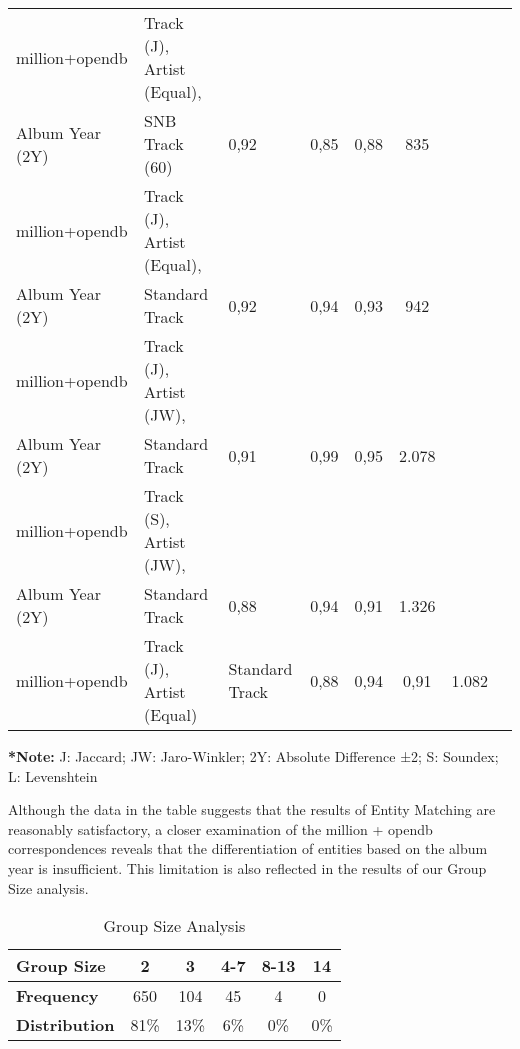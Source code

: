 \documentclass[runningheads]{llncs}
\begin{document}
\begin{table}[]
\begin{threeparttable}
\begin{tabular}{lp{4.5cm}p{2cm}ccccc}
		million+opendb       & \raggedright Track (J), Artist (Equal), \\ Album Year (2Y)           & \raggedright SNB Track (60)              & 0,92             & 0,85         & 0,88       & 835              \\
		\rowcolor[HTML]{FFFFCC} 
		million+opendb       & \raggedright Track (J), Artist (Equal), \\ Album Year (2Y)           & \raggedright Standard Track                            & 0,92             & 0,94         & 0,93      & 942              \\
		million+opendb       & \raggedright Track (J), Artist (JW), \\ Album Year (2Y)     & \raggedright Standard Track                            & 0,91             & 0,99         & 0,95       & 2.078            \\ 
		million+opendb       & \raggedright Track (S), Artist (JW), \\ Album Year (2Y)     & \raggedright Standard Track                            & 0,88             & 0,94         & 0,91       & 1.326            \\
		million+opendb       & \raggedright Track (J), Artist (Equal)                                & \raggedright Standard Track                            & 0,88             & 0,94         & 0,91      & 1.082            \\ \hline\hline
	\end{tabular}
	\begin{tablenotes}
		\footnotesize
		\item \textbf{*Note:} J: Jaccard; JW: Jaro-Winkler; 2Y: Absolute Difference ±2; S: Soundex; L: Levenshtein
		\end{tablenotes}
	\end{threeparttable}
\end{table}

Although the data in the table suggests that the results of Entity Matching are reasonably satisfactory, a closer examination of the million + opendb correspondences reveals that the differentiation of entities based on the album year is insufficient. This limitation is also reflected in the results of our Group Size analysis.
\setlength{\tabcolsep}{4pt} %
\begin{table}[ht]
	\centering
	\caption{Group Size Analysis}
	\label{tab:group_size}
	\begin{tabular}{lccccc}
	\hline
	\rowcolor[HTML]{D9D9D9} 
	\textbf{Group Size} & \textbf{2} & \textbf{3} & \textbf{4-7} & \textbf{8-13} & \textbf{14} \\ \hline
	\textbf{Frequency}  & 650        & 104        & 45           & 4            & 0           \\ \hline
	\textbf{Distribution} & 81\%       & 13\%       & 6\%          & 0\%           & 0\%         \\ \hline
	\end{tabular}
	\end{table}
	
\end{document}
